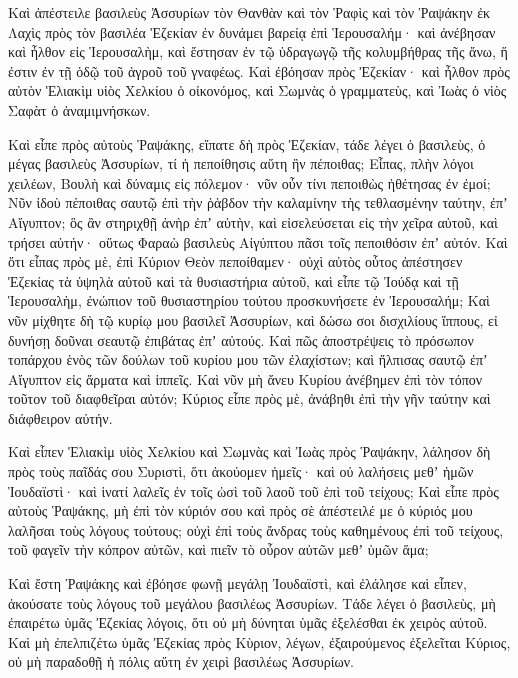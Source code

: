 {\par }{\PP {}Καὶ ἀπέστειλε βασιλεὺς Ἀσσυρίων τὸν Θανθὰν καὶ τὸν Ῥαφὶς καὶ τὸν Ῥαψάκην ἐκ Λαχὶς πρὸς τὸν βασιλέα Ἑζεκίαν ἐν δυνάμει βαρείᾳ ἐπὶ Ἱερουσαλήμ· καὶ ἀνέβησαν καὶ ἦλθον εἰς Ἱερουσαλὴμ, καὶ ἔστησαν ἐν τῷ ὑδραγωγῷ τῆς κολυμβήθρας τῆς ἄνω, ἥ ἐστιν ἐν τῇ ὁδῷ τοῦ ἀγροῦ τοῦ γναφέως.
Καὶ ἐβόησαν πρὸς Ἐζεκίαν· καὶ ἦλθον πρὸς αὐτὸν Ἑλιακὶμ υἱὸς Χελκίου ὁ οἰκονόμος, καὶ Σωμνὰς ὁ γραμματεὺς, καὶ Ἰωὰς ὁ νἱὸς Σαφὰτ ὁ ἀναμιμνήσκων.
\par }{\PP {}Καὶ εἶπε πρὸς αὐτοὺς Ῥαψάκης, εἴπατε δὴ πρὸς Ἐζεκίαν, τάδε λέγει ὁ βασιλεὺς, ὁ μέγας βασιλεὺς Ἀσσυρίων, τί ἡ πεποίθησις αὕτη ἣν πέποιθας;
Εἶπας, πλὴν λόγοι χειλέων, Βουλὴ καὶ δύναμις εἰς πόλεμον· νῦν οὖν τίνι πεποιθὼς ἠθέτησας ἐν ἐμοί;
Νῦν ἰδοὺ πέποιθας σαυτῷ ἐπὶ τὴν ῥἁβδον τὴν καλαμίνην τὴς τεθλασμένην ταύτην, ἐπʼ Αἴγυπτον; ὃς ἂν στηριχθῇ ἀνὴρ ἐπʼ αὐτὴν, καὶ εἰσελεύσεται εἰς τὴν χεῖρα αὐτοῦ, καὶ τρήσει αὐτήν· οὕτως Φαραὼ βασιλεὺς Αἰγύπτου πᾶσι τοῖς πεποιθόσιν ἐπʼ αὐτόν.
Καὶ ὅτι εἶπας πρὸς μὲ, ἐπὶ Κύριον Θεὸν πεποίθαμεν· οὐχὶ αὐτὸς οὗτος ἀπέστησεν Ἐζεκίας τὰ ὑψηλὰ αὐτοῦ καὶ τὰ θυσιαστήρια αὐτοῦ, καὶ εἶπε τῷ Ἰούδᾳ καὶ τῇ Ἱερουσαλὴμ, ἐνώπιον τοῦ θυσιαστηρίου τούτου προσκυνήσετε ἐν Ἰερουσαλήμ;
Καὶ νῦν μίχθητε δὴ τῷ κυρίῳ μου βασιλεῖ Ἀσσυρίων, καὶ δώσω σοι δισχιλίους ἵππους, εἰ δυνήσῃ δοῦναι σεαυτῷ ἐπιβάτας ἐπʼ αὐτούς.
Καὶ πῶς ἀποστρέψεις τὸ πρόσωπον τοπάρχου ἑνὸς τῶν δούλων τοῦ κυρίου μου τῶν ἐλαχίστων; καὶ ἤλπισας σαυτῷ ἐπʼ Αἴγυπτον εἰς ἅρματα καὶ ἱππεῖς.
Καὶ νῦν μὴ ἄνευ Κυρίου ἀνέβημεν ἐπὶ τὸν τόπον τοῦτον τοῦ διαφθεῖραι αὐτόν; Κύριος εἶπε πρὸς μὲ, ἀνάβηθι ἐπὶ τὴν γῆν ταύτην καὶ διάφθειρον αὐτήν.
\par }{\PP {}Καὶ εἶπεν Ἑλιακὶμ υἱὸς Χελκίου καὶ Σωμνὰς καὶ Ἰωὰς πρὸς Ῥαψάκην, λάλησον δὴ πρὸς τοὺς παῖδάς σου Συριστὶ, ὅτι ἀκούομεν ἡμεῖς· καὶ οὐ λαλήσεις μεθʼ ἡμῶν Ἰουδαϊστὶ· καὶ ἱνατί λαλεῖς ἐν τοῖς ὠσὶ τοῦ λαοῦ τοῦ ἐπὶ τοῦ τείχους;
Καὶ εἶπε πρὸς αὐτοὺς Ῥαψάκης, μὴ ἐπὶ τὸν κύριόν σου καὶ πρὸς σὲ ἀπέστειλέ με ὁ κύριός μου λαλῆσαι τοὺς λόγους τούτους; οὐχὶ ἐπὶ τοὺς ἄνδρας τοὺς καθημένους ἐπὶ τοῦ τείχους, τοῦ φαγεῖν τὴν κόπρον αὐτῶν, καὶ πιεῖν τὸ οὖρον αὐτῶν μεθʼ ὑμῶν ἅμα;
\par }{\PP {}Καὶ ἔστη Ῥαψάκης καὶ ἐβόησε φωνῇ μεγάλῃ Ἰουδαϊστὶ, καὶ ἐλάλησε καὶ εἶπεν, ἀκούσατε τοὺς λόγους τοῦ μεγάλου βασιλέως Ἀσσυρίων.
Τάδε λέγει ὁ βασιλεὺς, μὴ ἐπαιρέτω ὑμᾶς Ἐζεκίας λόγοις, ὅτι οὐ μὴ δύνηται ὑμᾶς ἐξελέσθαι ἐκ χειρὸς αὐτοῦ.
Καὶ μὴ ἐπελπιζέτω ὑμᾶς Ἐζεκίας πρὸς Κὺριον, λέγων, ἐξαιρούμενος ἐξελεῖται Κύριος, οὐ μὴ παραδοθῇ ἡ πόλις αὕτη ἐν χειρὶ βασιλέως Ἀσσυρίων.
}
